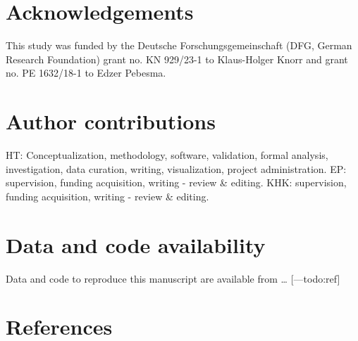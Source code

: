\documentclass[
  12pt,
]{article}
\begin{document}
\hypertarget{acknowledgements}{%
\section*{Acknowledgements}\label{acknowledgements}}

This study was funded by the Deutsche Forschungsgemeinschaft (DFG, German Research Foundation) grant no. KN 929/23-1 to Klaus-Holger Knorr and grant no. PE 1632/18-1 to Edzer Pebesma.

\hypertarget{author-contributions}{%
\section*{Author contributions}\label{author-contributions}}

HT: Conceptualization, methodology, software, validation, formal analysis, investigation, data curation, writing, visualization, project administration. EP: supervision, funding acquisition, writing - review \& editing. KHK: supervision, funding acquisition, writing - review \& editing.

\hypertarget{data-and-code-availability}{%
\section*{Data and code availability}\label{data-and-code-availability}}

Data and code to reproduce this manuscript are available from \ldots{} {[}---todo:ref{]}

\hypertarget{references}{%
\section*{References}\label{references}}
\end{document}

